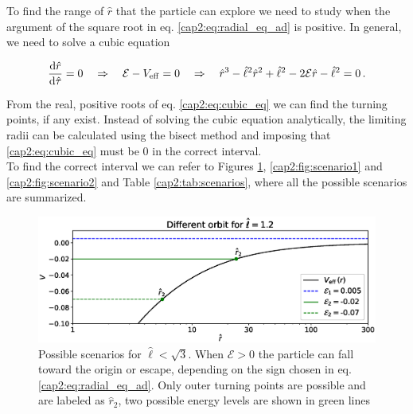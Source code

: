To find the range of $\hat r$ that the particle can explore we need to study when the
argument of the square root in eq. \ref{cap2:eq:radial_eq_ad} is positive.
In general, we need to solve a cubic equation

\begin{equation}
    \dv{\hat r}{\hat \tau} = 0
    \quad \Rightarrow \quad
    \mathcal E - V_{\rm eff} = 0
    \quad \Rightarrow \quad
    \hat r^3 - \hat \ell^2 \hat r^2 + \hat \ell^2 - 2 \mathcal E
    \hat r - \hat \ell^2 = 0 \, .
    \label{cap2:eq:cubic_eq}
\end{equation}

From the real, positive roots of eq. \ref{cap2:eq:cubic_eq} we can find the
turning points, if any exist.
Instead of solving the cubic equation analytically, the limiting radii can be
calculated using the bisect method and imposing that \ref{cap2:eq:cubic_eq}
must be 0 in the correct interval. \\
To find the correct interval we can refer to Figures \ref{cap2:fig:scenario0},
\ref{cap2:fig:scenario1} and \ref{cap2:fig:scenario2} and Table
\ref{cap2:tab:scenarios}, where all the possible scenarios are summarized.

\begin{figure}[h!]
    \centering
    \includegraphics[width= 0.66 \textwidth]{Figures/chapter2/scenario0.eps}
    \caption{Possible scenarios for $\hat \ell < \sqrt{3}$.
    When $\mathcal E > 0$ the particle can fall toward the origin or escape,
    depending on the sign chosen in eq. \ref{cap2:eq:radial_eq_ad}.
    Only outer turning points are possible and are labeled as $\hat r_2$, two
    possible energy levels are shown in green lines
    }
    \label{cap2:fig:scenario0}
\end{figure}

